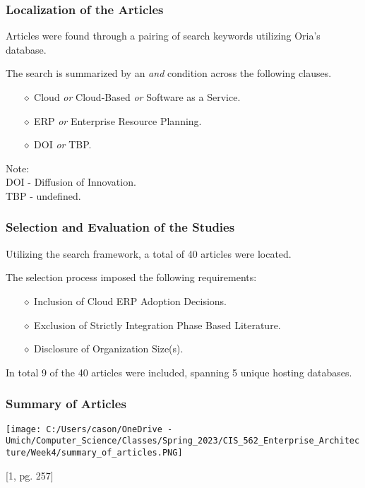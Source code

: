 \documentclass{beamer}
\begin{document}
\begin{frame}

    \frametitle{Localization of the Articles}

    Articles were found through a pairing of search keywords utilizing Oria's database. \pause

    \vspace{5mm}
    The search is summarized by an \emph{and} condition across the following clauses.
    \begin{itemize}
        \item[$\diamond$] Cloud \emph{or} Cloud-Based \emph{or} Software as a Service. \pause
        \item[$\diamond$] ERP \emph{or} Enterprise Resource Planning. \pause
        \item[$\diamond$] DOI \emph{or} TBP.
    \end{itemize} \pause

    \vspace{5mm}
    \footnotesize 
    Note: \\
    DOI - Diffusion of Innovation. \\
    TBP - undefined.


\end{frame}

\begin{frame}

    \frametitle{Selection and Evaluation of the Studies}

    Utilizing the search framework, a total of 40 articles were located. \pause

    \vspace{5mm}
    The selection process imposed the following requirements:
    \begin{itemize}
        \item[$\diamond$] Inclusion of Cloud ERP Adoption Decisions. \pause
        \item[$\diamond$] Exclusion of Strictly Integration Phase Based Literature. \pause
        \item[$\diamond$] Disclosure of Organization Size(s).
    \end{itemize} \pause

    \vspace{5mm}
    In total 9 of the 40 articles were included, spanning 5 unique hosting databases.

\end{frame}

\begin{frame}

    \frametitle{Summary of Articles}

    \centering
    \texttt{[image: C:/Users/cason/OneDrive - Umich/Computer\_Science/Classes/Spring\_2023/CIS\_562\_Enterprise\_Architecture/Week4/summary\_of\_articles.PNG]}

    \footnotesize {[1, pg. 257]}

\end{frame}
\end{document}
